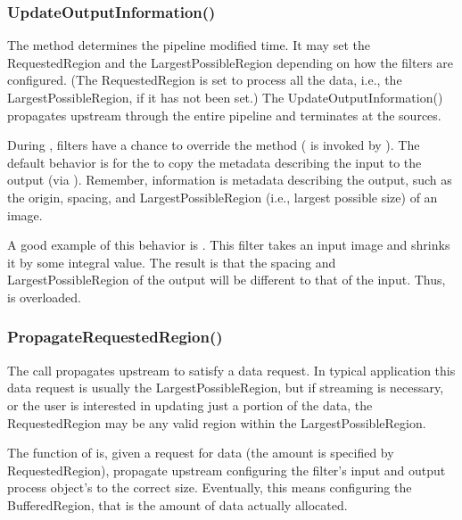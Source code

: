 \subsubsection{UpdateOutputInformation()}
\label{sec:UpdateOutputInformation}

The  method determines the pipeline modified
time. It may set the RequestedRegion and the LargestPossibleRegion depending
on how the filters are configured. (The RequestedRegion is set to process all
the data, i.e., the LargestPossibleRegion, if it has not been set.) The
UpdateOutputInformation() propagates upstream through the entire pipeline and
terminates at the sources.

During , filters have a chance to override the
 method
( is invoked by
). The default behavior is for the
 to copy the metadata describing the input
to the output (via ). Remember, information
is metadata describing the output, such as the origin, spacing,
and LargestPossibleRegion (i.e., largest possible size) of an image.

A good example of this behavior is . This filter
takes an input image and shrinks it by some integral value. The result is that
the spacing and LargestPossibleRegion of the output will be different to that 
of the input. Thus,  is overloaded.

\subsubsection{PropagateRequestedRegion()}
\label{sec:PropagateRequestedRegion}

The  call propagates upstream to 
satisfy a data request. In typical application this data request is usually the
LargestPossibleRegion, but if streaming is necessary, or the user is
interested in updating just a portion of the data, the RequestedRegion may be
any valid region within the LargestPossibleRegion.

The function of  is, given a request
for data (the amount is specified by RequestedRegion), propagate
upstream configuring the filter's input and output process object's to
the correct size. Eventually, this means configuring the
BufferedRegion, that is the amount of data actually allocated.

